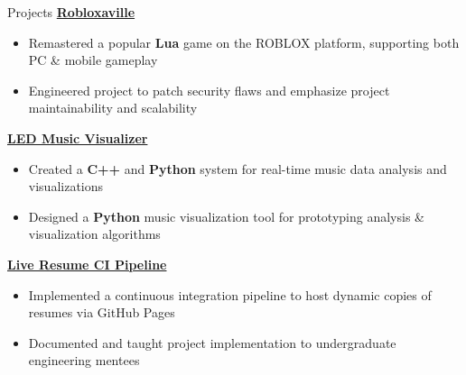\documentclass{resume/resume}
\begin{document}
\begin{rSection}{Projects}
    \href{https://www.roblox.com/games/272941/Robloxaville}{\bf Robloxaville}
    \vspace{-6pt}
    \begin{itemize}[nosep]
      \item Remastered a popular {\bf Lua} game on the ROBLOX platform, supporting both PC \& mobile gameplay
      \item Engineered project to patch security flaws and emphasize project maintainability and scalability 
    \end{itemize}
    
    \href{https://www.linkedin.com/feed/update/urn:li:activity:6603722406240628736/}{\bf LED Music Visualizer}
    \vspace{-6pt}
    \begin{itemize}[nosep]
      \item Created a {\bf C++} and {\bf Python} system for real-time music data analysis and visualizations
      \item Designed a {\bf Python} music visualization tool for prototyping analysis \& visualization algorithms
    \end{itemize}
    
    \href{https://github.com/Spelkington/spelkington.github.io}{\bf Live Resume CI Pipeline}
    \vspace{-6pt}
    \begin{itemize}[nosep]
        \item Implemented a continuous integration pipeline to host dynamic copies of resumes via GitHub Pages
        \item Documented and taught project implementation to undergraduate engineering mentees
    \end{itemize}

    

\end{rSection}
\end{document}
